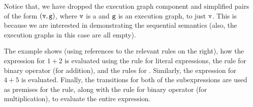 Notice that, we have dropped the execution graph component and simplified pairs of the form $(\texttt{v},\texttt{g})$,
where $\texttt{v}$ is a \nativevalueterm{}  and $\texttt{g}$ is an execution graph, to just $\texttt{v}$.
This is because we are interested in demonstrating the sequential semantics (also, the execution graphs
in this case are all empty).

The example shows (using references to the relevant rules on the right), how the expression for $1+2$ is evaluated
using the rule for literal expressions, the rule for binary operator (for addition), and the rules for \binopexpressionsterm{}.
Similarly, the expression for $4+5$ is evaluated.
Finally, the transitions for both of the subexpressions are used as premises for the \binopexpressionterm{}
rule, along with the rule for binary operator (for multiplication), to evaluate the entire expression.

\begin{mathpar}
\end{mathpar}

\begin{mathpar}
\end{mathpar}

